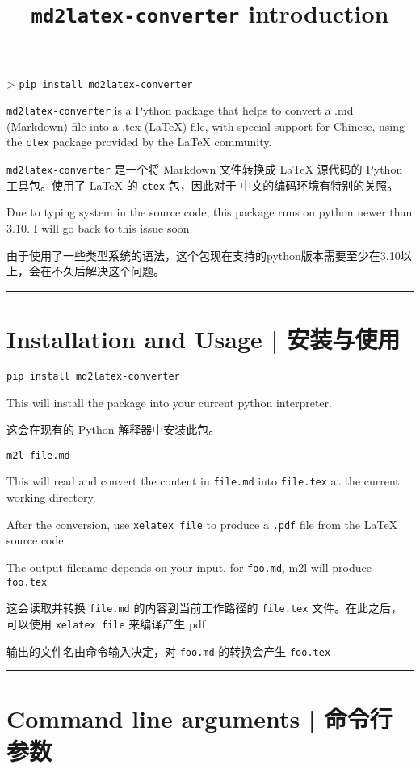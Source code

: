 \documentclass{ctexart}
\title{\texttt{md2latex-converter} introduction }
\begin{document}
	\maketitle
	
	> \texttt{pip install md2latex-converter}
	
	\texttt{md2latex-converter} is a Python package that helps to convert a .md (Markdown) file into a .tex (LaTeX) file, with special support for Chinese, using the \texttt{ctex} package provided by the LaTeX community.
	
	\texttt{md2latex-converter} 是一个将 Markdown 文件转换成 LaTeX 源代码的 Python 工具包。使用了 LaTeX 的 \texttt{ctex} 包，因此对于 中文的编码环境有特别的关照。
	
	Due to typing system in the source code, this package runs on python newer than 3.10. I will go back to this issue soon.
	
	由于使用了一些类型系统的语法，这个包现在支持的python版本需要至少在3.10以上，会在不久后解决这个问题。
	
	\noindent\rule{\textwidth}{1pt}
	
	\section{Installation and Usage | 安装与使用}
	
	\texttt{pip install md2latex-converter}
	
	This will install the package into your current python interpreter.
	
	这会在现有的 Python 解释器中安装此包。
	
	\texttt{m2l file.md}
	
	This will read and convert the content in \texttt{file.md} into \texttt{file.tex} at the current working directory.
	
	After the conversion, use \texttt{xelatex file} to produce a \texttt{.pdf} file from the LaTeX source code.
	
	The output filename depends on your input, for \texttt{foo.md}, m2l will produce \texttt{foo.tex}
	
	这会读取并转换 \texttt{file.md} 的内容到当前工作路径的 \texttt{file.tex} 文件。在此之后，可以使用 \texttt{xelatex file} 来编译产生 pdf
	
	输出的文件名由命令输入决定，对 \texttt{foo.md} 的转换会产生 \texttt{foo.tex}
	
	\noindent\rule{\textwidth}{1pt}
	
	\section{Command line arguments | 命令行参数}
	
\end{document}
